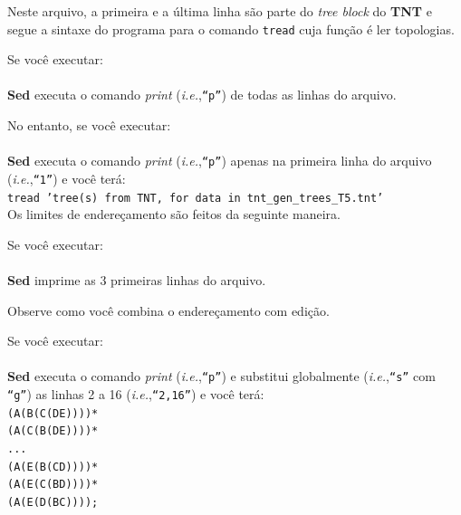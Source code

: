 \begin{refsection}
Neste arquivo, a primeira e a última linha são parte do \textit{tree block} do \textbf{TNT} e segue a sintaxe do programa para o comando \texttt{tread} cuja função é ler topologias.

Se você executar:\\

\\

\textbf{Sed} executa o comando \textit{print} (\textit{i.e.},\texttt{``p''}) de todas as linhas do arquivo.

No entanto, se você executar:\\

\\

\textbf{Sed} executa o comando \textit{print} (\textit{i.e.},\texttt{``p''}) apenas na primeira linha do arquivo (\textit{i.e.},\texttt{``1''}) e você terá:\\

\texttt{tread 'tree(s) from TNT, for data in tnt\_gen\_trees\_T5.tnt'}\\

Os limites de endereçamento são feitos da seguinte maneira.

Se você executar:\\

\\

\textbf{Sed} imprime as 3 primeiras linhas do arquivo.

Observe como você combina o endereçamento com edição.

Se você executar:\\

\\

\textbf{Sed} executa o comando \textit{print} (\textit{i.e.},\texttt{``p''}) e substitui globalmente (\textit{i.e.},\texttt{``s''} com \texttt{``g''}) as linhas 2 a 16 (\textit{i.e.},\texttt{``2,16''}) e você terá:\\

\noindent\texttt{(A(B(C(DE))))*}\\
\texttt{(A(C(B(DE))))*}\\
\texttt{...}\\
\texttt{(A(E(B(CD))))*}\\
\texttt{(A(E(C(BD))))*}\\
\texttt{(A(E(D(BC))));}\\


\end{refsection}
